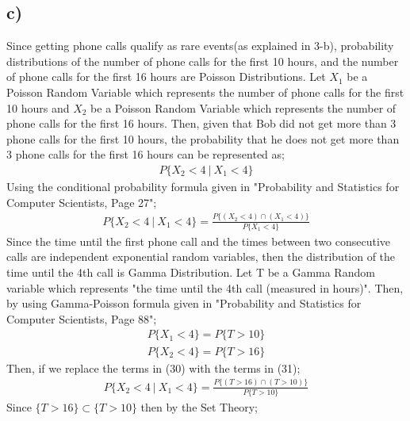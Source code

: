 \documentclass[12pt]{article}
\begin{document}
\subsection*{c)} Since getting phone calls qualify as rare events(as explained in 3-b), probability distributions of the number of phone calls for the first 10 hours, and the number of phone calls for the first 16 hours are Poisson Distributions. Let $X_{1}$ be a Poisson Random Variable which represents the number of phone calls for the first 10 hours and $X_{2}$ be a Poisson Random Variable which represents the number of phone calls for the first 16 hours. Then, given that Bob did not get more than 3 phone calls for the first 10 hours, the probability that he does not get more than 3 phone calls for the first 16 hours can be represented as;
\begin{equation} 
\begin{split}
P\{X_{2} < 4 \ |\ X_{1} < 4\}
\end{split}
\end{equation}
Using the conditional probability formula given in "Probability and Statistics for Computer Scientists, Page 27";
\begin{equation} 
\begin{split}
P\{X_{2} < 4 \ |\ X_{1} < 4\} = \frac{ P\{(X_{2} < 4) \cap (X_{1} < 4)\}}{P\{X_{1} < 4\}}
\end{split}
\end{equation}
Since the time until the first phone call and the times between two consecutive calls are independent exponential random variables, then the distribution of the time until the 4th call is Gamma Distribution. Let T be a Gamma Random variable which represents "the time until the 4th call (measured in hours)". Then, by using Gamma-Poisson formula given in "Probability and Statistics for Computer Scientists, Page 88";
\begin{equation} 
\begin{split}
P\{X_{1}<4 \} = P\{T>10\} \\
P\{X_{2}<4 \} = P\{T>16\}
\end{split}
\end{equation}
Then, if we replace the terms in (30) with the terms in (31);
\begin{equation} 
\begin{split}
P\{X_{2} < 4 \ |\ X_{1} < 4\} = \frac{ P\{(T>16) \cap (T>10)\}}{P\{T>10\}}
\end{split}
\end{equation}
Since $\{T>16\} \subset \{T>10\}$ then by the Set Theory;
\end{document}

